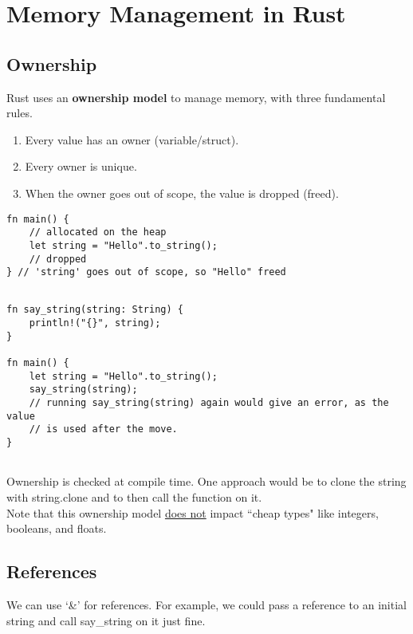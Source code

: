 \section{Memory Management in Rust}

\subsection{Ownership}

\begin{definition}
Rust uses an \textbf{ownership model} to manage memory, with three fundamental rules.
\begin{enumerate}
\item Every value has an owner (variable/struct).
\item Every owner is unique.
\item When the owner goes out of scope, the value is dropped (freed).
\end{enumerate}
\end{definition}

\begin{lstlisting}[frame = none]
fn main() {
    // allocated on the heap
    let string = "Hello".to_string();
    // dropped
} // 'string' goes out of scope, so "Hello" freed


\end{lstlisting}


\begin{lstlisting}[frame = none]
fn say_string(string: String) {
    println!("{}", string);
}

fn main() {
    let string = "Hello".to_string();
    say_string(string);
    // running say_string(string) again would give an error, as the value
    // is used after the move.
} 


\end{lstlisting}

Ownership is checked at compile time. One approach would be to clone the string with string.clone and to then call the function on it. \\

Note that this ownership model \underline{does not} impact ``cheap types" like integers, booleans, and floats.

\subsection{References}
We can use `\&' for references. For example, we could pass a reference to an initial string and call say\_string on it just fine.

